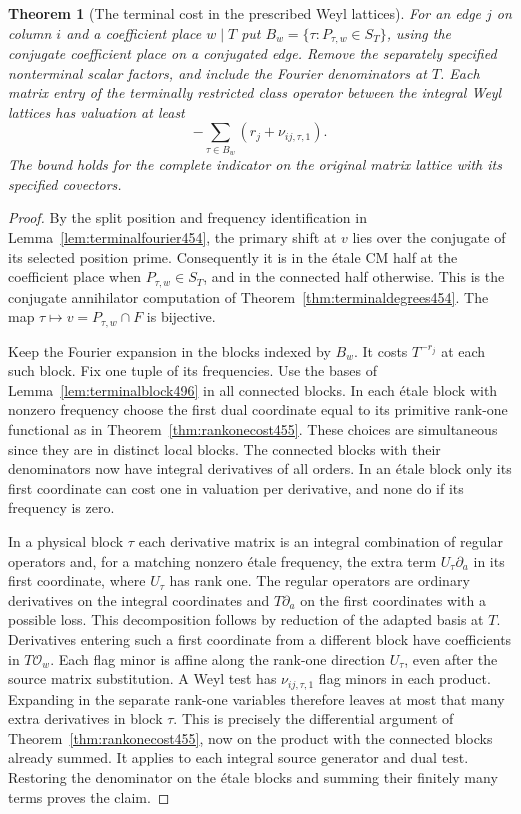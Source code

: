\documentclass[a4paper,11pt]{article}
\newtheorem{theorem}[proposition]{Theorem}
\theoremstyle{definition}
\theoremstyle{remark}
\numberwithin{equation}{section}
\begin{document}
\begin{theorem}[The terminal cost in the prescribed Weyl lattices]\leavevmode
\label{thm:terminalhalf496}
For an edge \(j\) on column \(i\) and a coefficient place \(w\mid T\)
put \(B_w=\{\tau:P_{\tau,w}\in S_T\}\), using the conjugate
coefficient place on a conjugated edge. Remove the separately
specified nonterminal scalar factors, and include the Fourier
denominators at \(T\). Each matrix entry of the terminally
restricted class operator between the integral Weyl lattices
has valuation at least
\[
                   -\sum_{\tau\in B_w}
                                  (r_j+\nu_{ij,\tau,1}) .
\]
The bound holds for the complete indicator on the original
matrix lattice with its specified covectors.
\end{theorem}
\begin{proof}
By the split position and frequency identification in
Lemma~\ref{lem:terminalfourier454}, the primary shift at \(v\)
lies over the conjugate of its selected position prime.
Consequently it is in the \'etale CM half at the coefficient
place when \(P_{\tau,w}\in S_T\), and in the connected half
otherwise. This is the conjugate annihilator computation of
Theorem~\ref{thm:terminaldegrees454}. The map
\(\tau\mapsto v=P_{\tau,w}\cap F\) is bijective.

Keep the Fourier expansion in the blocks indexed by \(B_w\).
It costs \(T^{-r_j}\) at each such block. Fix one tuple of its
frequencies. Use the bases of Lemma~\ref{lem:terminalblock496}
in all connected blocks. In each \'etale block with nonzero
frequency choose the first dual coordinate equal to its
primitive rank-one functional as in
Theorem~\ref{thm:rankonecost455}. These choices are simultaneous
since they are in distinct local blocks. The connected blocks
with their denominators now have integral derivatives of all
orders. In an \'etale block only its first coordinate can cost
one in valuation per derivative, and none do if its frequency
is zero.

In a physical block \(\tau\) each derivative matrix is an
integral combination of regular operators and, for a matching
nonzero \'etale frequency, the extra term \(U_\tau\partial_a\)
in its first coordinate, where \(U_\tau\) has rank one.
The regular operators are ordinary derivatives on the integral
coordinates and \(T\partial_a\) on the first coordinates
with a possible loss. This decomposition follows by reduction
of the adapted basis at \(T\). Derivatives entering such a
first coordinate from a different block have coefficients
in \(T\mathcal O_w\). Each flag minor is affine along the
rank-one direction \(U_\tau\), even after the source matrix
substitution. A Weyl test has \(\nu_{ij,\tau,1}\) flag minors
in each product. Expanding in the separate rank-one variables
therefore leaves at most that many extra derivatives in block
\(\tau\). This is precisely the differential argument of
Theorem~\ref{thm:rankonecost455}, now on the product with
the connected blocks already summed. It applies to each
integral source generator and dual test. Restoring the
denominator on the \'etale blocks and summing their finitely
many terms proves the claim.
\end{proof}
\end{document}
